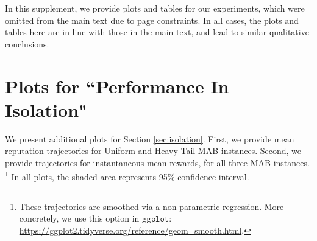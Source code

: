 \documentclass[../competing_bandits_with_appendix.tex]{subfiles}
\begin{document}
\begin{appendices}




In this supplement, we provide plots and tables for our experiments, which were omitted from the main text due to page constraints. In all cases, the plots and tables here are in line with those in the main text, and lead to similar qualitative conclusions.

\section{Plots for ``Performance In Isolation"}

We present additional plots for Section \ref{sec:isolation}. First, we provide mean reputation trajectories for Uniform and Heavy Tail MAB instances. Second, we provide trajectories for instantaneous mean rewards, for all three MAB instances.%
\footnote{These trajectories are smoothed via a non-parametric regression.
More concretely, we use this option in $\texttt{ggplot}$:
\url{https://ggplot2.tidyverse.org/reference/geom_smooth.html}.}
In all plots, the shaded area represents 95\% confidence interval.


\end{appendices}
\end{document}
